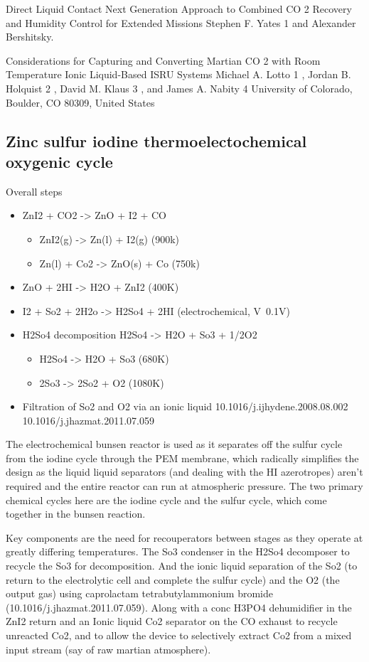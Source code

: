 \documentclass[10pt]{article}
\begin{document}
Direct Liquid Contact  Next Generation Approach to
Combined CO 2 Recovery and Humidity Control for
Extended Missions
Stephen F. Yates 1 and Alexander Bershitsky.

Considerations for Capturing and Converting Martian CO 2
with Room Temperature Ionic Liquid-Based ISRU Systems
Michael A. Lotto 1 , Jordan B. Holquist 2 , David M. Klaus 3 , and James A. Nabity 4
University of Colorado, Boulder, CO 80309, United States


\subsection*{Zinc sulfur iodine thermoelectochemical oxygenic cycle}

Overall steps
\begin{itemize}
    \item ZnI2 + CO2 -> ZnO + I2 + CO
    \begin{itemize}
        \item ZnI2(g) -> Zn(l) + I2(g) (900k)
        \item Zn(l) + Co2 -> ZnO(s) + Co (750k)
    \end{itemize}
    \item ZnO + 2HI -> H2O + ZnI2 (400K)
    \item I2 + So2 + 2H2o -> H2So4 + 2HI (electrochemical, V~0.1V)
    \item H2So4 decomposition H2So4 -> H2O + So3 + 1/2O2
    \begin{itemize}
        \item H2So4 -> H2O + So3 (680K)
        \item 2So3 -> 2So2 + O2 (1080K)
    \end{itemize}
    \item Filtration of So2 and O2 via an ionic liquid 10.1016/j.ijhydene.2008.08.002 10.1016/j.jhazmat.2011.07.059
\end{itemize}

The electrochemical bunsen reactor is used as it separates off the sulfur cycle from the iodine cycle through the PEM membrane, which radically simplifies the design as the liquid liquid separators (and dealing with the HI azerotropes) aren't required and the entire reactor can run at atmospheric pressure. The two primary chemical cycles here are the iodine cycle and the sulfur cycle, which come together in the bunsen reaction.

Key components are the need for recouperators between stages as they operate at greatly differing temperatures. The So3 condenser in the H2So4 decomposer to recycle the So3 for decomposition. And the ionic liquid separation of the So2 (to return to the electrolytic cell and complete the sulfur cycle) and the O2 (the output gas) using caprolactam tetrabutylammonium bromide (10.1016/j.jhazmat.2011.07.059). Along with a conc H3PO4 dehumidifier in the ZnI2 return and an Ionic liquid Co2 separator on the CO exhaust to recycle unreacted Co2, and to allow the device to selectively extract Co2 from a mixed input stream (say of raw martian atmosphere).
\end{document}
